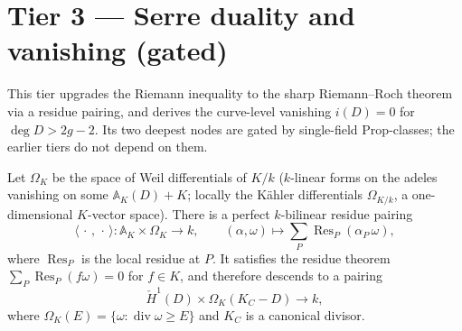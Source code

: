 \section{Tier 3 --- Serre duality and vanishing (gated)}
\label{sec:RiemannRoch_Adelic_duality}

This tier upgrades the Riemann inequality to the sharp Riemann--Roch
theorem via a residue pairing, and derives the curve-level vanishing
\(i(D) = 0\) for \(\deg D > 2g - 2\). Its two deepest nodes are gated by
single-field \(\mathrm{Prop}\)-classes; the earlier tiers do not depend on
them.

\begin{definition}
  \label{thm:adelic_residuePairing}
  \notready  %
  Let \(\Omega_K\) be the space of Weil differentials of \(K/k\)
  (\(k\)-linear forms on the adeles vanishing on some
  \(\mathbb{A}_K(D) + K\); locally the Kähler differentials
  \(\Omega_{K/k}\), a one-dimensional \(K\)-vector space). There is a
  perfect \(k\)-bilinear residue pairing
  \[
    \langle\,\cdot\,,\,\cdot\,\rangle \colon
      \mathbb{A}_K \times \Omega_K \to k,
    \qquad
    (\alpha, \omega) \mapsto \sum_P \operatorname{Res}_P(\alpha_P\, \omega),
  \]
  where \(\operatorname{Res}_P\) is the local residue at \(P\). It
  satisfies the residue theorem \(\sum_P \operatorname{Res}_P(f\omega) = 0\)
  for \(f \in K\), and therefore descends to a pairing
  \[
    \check{H}^1(D) \times \Omega_K(K_C - D) \longrightarrow k,
  \]
  where \(\Omega_K(E) = \{\omega : \operatorname{div}\omega \ge E\}\) and
  \(K_C\) is a canonical divisor.
\end{definition}
